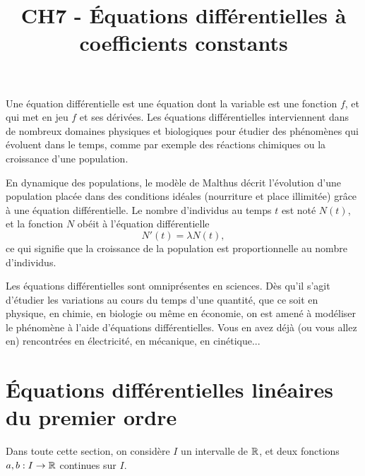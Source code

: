 \documentclass[a4paper, 11pt]{article}
\begin{document}
\title{CH7 - Équations différentielles à coefficients constants}


\noindent Une \'equation diff\'erentielle est une \'equation dont la variable est une fonction $f$, et qui met en jeu $f$ et ses d\'eriv\'ees. Les \'equations diff\'erentielles interviennent dans de nombreux domaines physiques et biologiques pour \'etudier des ph\'enom\`enes qui \'evoluent dans le temps, comme par exemple des r\'eactions chimiques ou la croissance d'une population.

\begin{exemple}
  En dynamique des populations, le mod\`ele de Malthus d\'ecrit l'\'evolution d'une population plac\'ee dans des conditions id\'eales (nourriture et place illimit\'ee) gr\^ace \`a une \'equation diff\'erentielle. Le nombre d'individus au temps $t$ est not\'e $N(t)$, et la fonction $N$ ob\'eit \`a l'\'equation diff\'erentielle
  $$N'(t) = \lambda N(t),$$
  ce qui signifie que la croissance de la population est proportionnelle au nombre d'individus.
\end{exemple}


\noindent Les \'equations diff\'erentielles sont omnipr\'esentes en sciences. D\`es qu'il s'agit d'\'etudier les variations au cours du temps d'une quantit\'e, que ce soit en physique, en chimie, en biologie ou m\^eme en \'economie, on est amen\'e \`a mod\'eliser le ph\'enom\`ene \`a l'aide d'\'equations diff\'erentielles. Vous en avez d\'ej\`a (ou vous allez en) rencontr\'ees en \'electricit\'e, en m\'ecanique, en cin\'etique...

\section{\'Equations diff\'erentielles lin\'eaires du premier ordre}

\noindent Dans toute cette section, on consid\`{e}re $I$ un intervalle de $\mathbb{R}$, et deux fonctions $a,b: I\rightarrow \mathbb{R}$ continues sur $I$.


\end{document}
